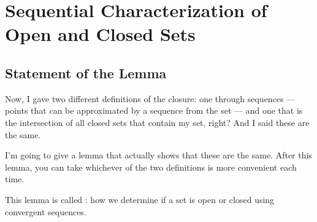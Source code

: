 \begin{content}
\begin{center}
\end{center}
\end{content}

\begin{hidden}
\end{hidden}

\section{Sequential Characterization of Open and Closed Sets}

\subsection{Statement of the Lemma}

\begin{speech}[00:35:04 - 00:36:04]
Now, I gave two different definitions of the closure: one through sequences --- points that can be approximated by a sequence from the set --- and one that is the intersection of all closed sets that contain my set, right? And I said these are the same.

I'm going to give a lemma that actually shows that these are the same. After this lemma, you can take whichever of the two definitions is more convenient each time.

This lemma is called : how we determine if a set is open or closed using convergent sequences. 
\end{speech}

